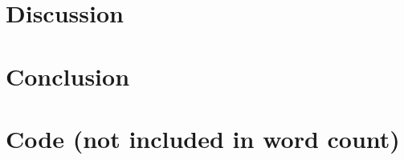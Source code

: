 \documentclass[12pt, titlepage=true, toc=bib]{scrartcl}
\begin{document}
\section{Discussion}

\section{Conclusion}

\section{Code (not included in word count)}



\newpage

\printbibliography
\end{document}
